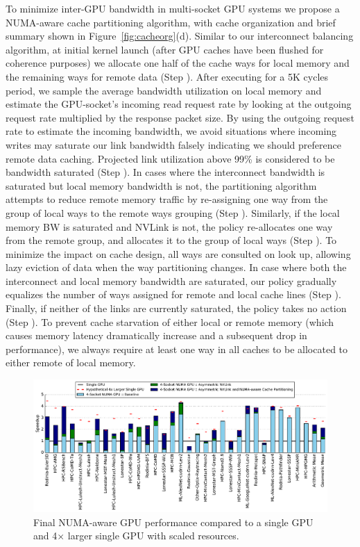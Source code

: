 To minimize inter-GPU bandwidth in multi-socket GPU systems we propose a
NUMA-aware cache partitioning algorithm, with cache organization and brief summary 
shown in Figure~\ref{fig:cacheorg}(d).  Similar to our interconnect balancing
algorithm, at initial kernel launch (after GPU caches have been flushed for
coherence purposes) we allocate one half of the cache ways for local memory and 
the remaining ways for remote data (Step ). After executing for a 5K cycles 
period, we sample the average bandwidth utilization on local memory and estimate
the GPU-socket's incoming read request rate by looking at the outgoing request rate
multiplied by the response packet size.  By using the outgoing request rate to estimate
the incoming bandwidth, we avoid situations where incoming writes may saturate
our link bandwidth falsely indicating we should preference remote data caching.
Projected link utilization above 99\% is considered to be bandwidth saturated 
(Step ). In cases where the interconnect bandwidth is saturated but
local memory bandwidth is not, the partitioning algorithm attempts to reduce remote 
memory traffic by re-assigning one way from the group of local ways to the
remote ways grouping (Step ).
Similarly, if the local memory BW is saturated and NVLink is not, the policy 
re-allocates one way from the remote group, and allocates it to the group of local ways (Step 
).  To minimize the impact on cache design, all ways are consulted on look
up, allowing lazy eviction of data when the way partitioning changes.
In case where both the interconnect and local memory bandwidth 
are saturated, our policy gradually equalizes the number of ways assigned for remote 
and local cache lines (Step ). Finally, if neither of the links are 
currently saturated, the policy takes no action (Step ).  To prevent
cache starvation of either local or remote memory (which causes memory latency
dramatically increase and a subsequent drop in performance), we always require at 
least one way in all caches to be allocated to either remote of local memory.

\begin{figure}[tp]
    \centering
    \includegraphics[width=1.0\textwidth]{figures/plot_final_speedup_WB_nvlink_first.pdf}
    \vspace{-0.2in}
    \caption{Final NUMA-aware GPU performance compared to a single GPU and 4$\times$ larger single GPU with scaled resources.}
    \label{fig:combined}
    \vspace{-.2in}
\end{figure}

